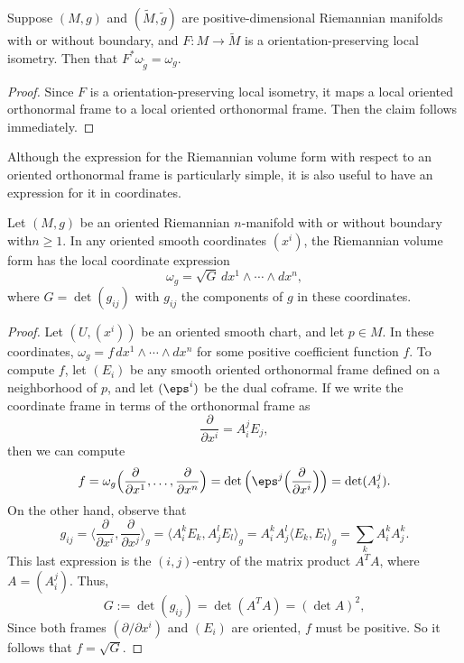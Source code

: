 \begin{proposition}
Suppose $(M,g)$ and $(\widetilde{M},\widetilde{g})$ are positive-dimensional Riemannian manifolds with or without boundary, and $F:M\to\widetilde{M}$ is a orientation-preserving local isometry. Then
that $F^*\omega_{\widetilde{g}}=\omega_g$.
\end{proposition}
\begin{proof}
Since $F$ is a orientation-preserving local isometry, it maps a local oriented orthonormal frame to a local oriented orthonormal frame. Then the claim follows immediately.
\end{proof}
Although the expression for the Riemannian volume form with respect to an oriented orthonormal frame is particularly simple, it is also useful to have an expression
for it in coordinates.
\begin{proposition}\label{Riemann volume form formula}
Let $(M,g)$ be an oriented Riemannian $n$-manifold with or without boundary with$n\geq1$. In any oriented smooth coordinates $(x^i)$, the Riemannian volume form has the local coordinate expression
\[\omega_g=\sqrt{G}\, dx^1\wedge\cdots\wedge dx^n,\]
where $G=\det(g_{ij})$ with $g_{ij}$ the components of $g$ in these coordinates.
\end{proposition}
\begin{proof}
Let $(U,(x^i))$ be an oriented smooth chart, and let $p\in M$. In these coordinates, $\omega_g=f\,dx^1\wedge\cdots\wedge dx^n$ for some positive coefficient function $f$. To compute $f$, let $(E_i)$ be any smooth oriented orthonormal frame defined on a neighborhood of $p$, and let $(\eps^i)$ be the dual coframe. If we write the coordinate frame in terms of the orthonormal frame as
\[\frac{\partial}{\partial x^i}=A^j_iE_j,\]
then we can compute
\[f=\omega_g\Big(\frac{\partial}{\partial x^1},\dots,\frac{\partial}{\partial x^n}\Big)=\det\Big(\eps^j\Big(\frac{\partial}{\partial x^i}\Big)\Big)=\det(A^j_i).\]
On the other hand, observe that
\[g_{ij}=\Big\langle\frac{\partial}{\partial x^i},\frac{\partial}{\partial x^j}\Big\rangle_g=\langle A^k_iE_k,A^l_jE_l\rangle_g=A^k_iA^l_j\langle E_k,E_l\rangle_g=\sum_kA^k_iA^k_j.\]
This last expression is the $(i,j)$-entry of the matrix product $A^TA$, where $A=(A^j_i)$. Thus,
\[G:=\det(g_{ij})=\det(A^TA)=(\det A)^2,\]
Since both frames $(\partial/\partial x^i)$ and $(E_i)$ are oriented, $f$ must be positive. So it follows that $f=\sqrt{G}$. 
\end{proof}
